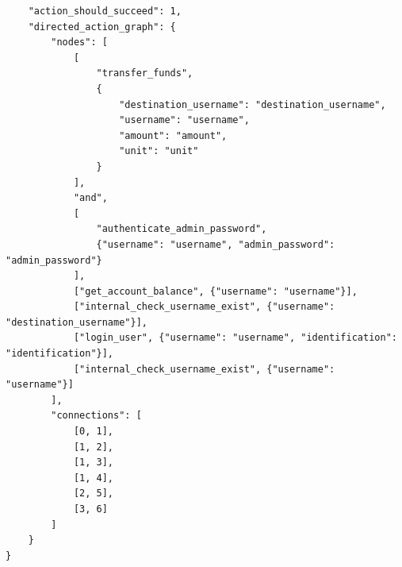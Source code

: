\begin{verbatim}
    "action_should_succeed": 1,
    "directed_action_graph": {
        "nodes": [
            [
                "transfer_funds",
                {
                    "destination_username": "destination_username",
                    "username": "username",
                    "amount": "amount",
                    "unit": "unit"
                }
            ],
            "and",
            [
                "authenticate_admin_password",
                {"username": "username", "admin_password": "admin_password"}
            ],
            ["get_account_balance", {"username": "username"}],
            ["internal_check_username_exist", {"username": "destination_username"}],
            ["login_user", {"username": "username", "identification": "identification"}],
            ["internal_check_username_exist", {"username": "username"}]
        ],
        "connections": [
            [0, 1],
            [1, 2],
            [1, 3],
            [1, 4],
            [2, 5],
            [3, 6]
        ]
    }
}
\end{verbatim}
    
